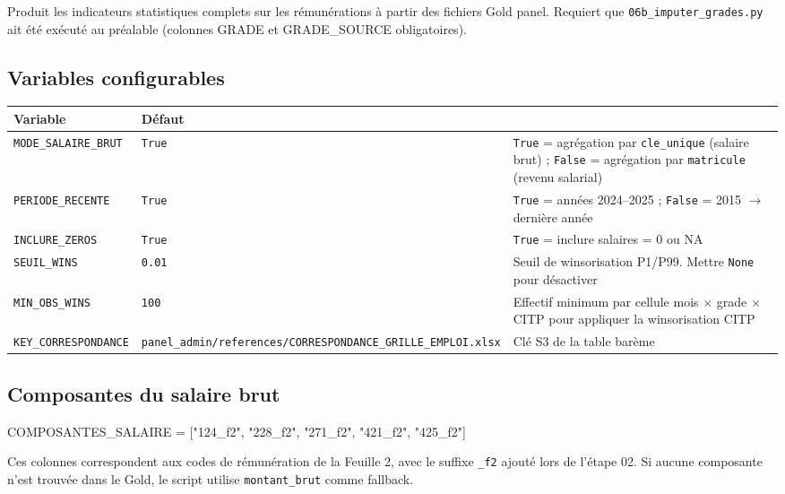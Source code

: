 \documentclass[12pt,a4paper,french]{report}
\begin{document}
Produit les indicateurs statistiques complets sur les rémunérations à partir
des fichiers Gold panel. Requiert que \texttt{06b\_imputer\_grades.py} ait
été exécuté au préalable (colonnes GRADE et GRADE\_SOURCE obligatoires).

\subsection{Variables configurables}

\begin{tabularx}{\textwidth}{lX}
  \toprule
  \textbf{Variable} & \textbf{Défaut} & \\
  \midrule
  \texttt{MODE\_SALAIRE\_BRUT} & \texttt{True} &
    \texttt{True} = agrégation par \texttt{cle\_unique} (salaire brut) ;
    \texttt{False} = agrégation par \texttt{matricule} (revenu salarial) \\
  \texttt{PERIODE\_RECENTE} & \texttt{True} &
    \texttt{True} = années 2024--2025 ; \texttt{False} = 2015 $\rightarrow$
    dernière année \\
  \texttt{INCLURE\_ZEROS} & \texttt{True} &
    \texttt{True} = inclure salaires = 0 ou NA \\
  \texttt{SEUIL\_WINS} & \texttt{0.01} &
    Seuil de winsorisation P1/P99. Mettre \texttt{None} pour désactiver \\
  \texttt{MIN\_OBS\_WINS} & \texttt{100} &
    Effectif minimum par cellule mois $\times$ grade $\times$ CITP pour
    appliquer la winsorisation CITP \\
  \texttt{KEY\_CORRESPONDANCE} &
    \texttt{panel\_admin/references/CORRESPONDANCE\_GRILLE\_EMPLOI.xlsx} &
    Clé S3 de la table barème \\
  \bottomrule
\end{tabularx}

\subsection{Composantes du salaire brut}

\begin{codebox}[]
COMPOSANTES\_SALAIRE = ["124\_f2", "228\_f2", "271\_f2", "421\_f2", "425\_f2"]
\end{codebox}

Ces colonnes correspondent aux codes de rémunération de la Feuille 2, avec
le suffixe \texttt{\_f2} ajouté lors de l'étape 02. Si aucune composante
n'est trouvée dans le Gold, le script utilise \texttt{montant\_brut} comme
fallback.
\end{document}
